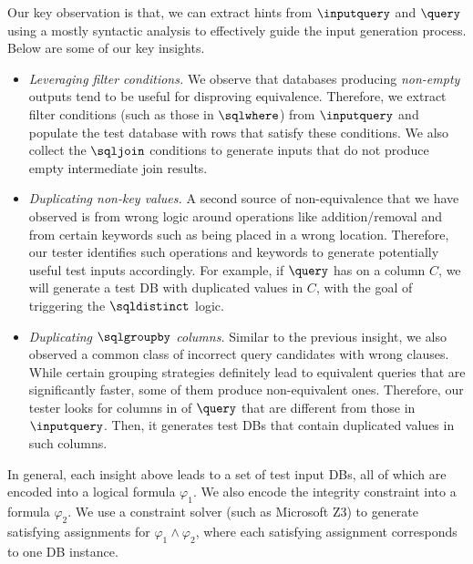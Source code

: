 Our key observation is that, we can extract hints from $\inputquery$ and $\query$ using a mostly syntactic analysis to effectively guide the input generation process. Below are some of our key insights. 
\begin{itemize}[leftmargin=*]
\item 
\emph{Leveraging filter conditions.}
We observe that databases producing \emph{non-empty} outputs tend to be useful for disproving equivalence. 
Therefore, we extract filter conditions (such as those in $\sqlwhere$) from $\inputquery$ and populate the test database with rows that satisfy these conditions. 
We also collect the $\sqljoin$ conditions to generate inputs that do not produce empty intermediate join results. 
\item 
\emph{Duplicating non-key values.}
A second source of non-equivalence that we have observed is from wrong logic around operations like addition/removal and from certain keywords such as \sqldistinct being placed in a wrong location. 
Therefore, our tester identifies such operations and keywords to generate potentially useful test inputs accordingly. For example, if $\query$ has \sqldistinct on a column $C$, we will generate a test DB with duplicated values in $C$, with the goal of triggering the $\sqldistinct$ logic. 
\item 
\emph{Duplicating $\sqlgroupby$ columns.}
Similar to the previous insight, we also observed a common class of incorrect query candidates with wrong \sqlgroupby clauses. 
While certain grouping strategies definitely lead to equivalent queries that are significantly faster, some of them produce non-equivalent ones. 
Therefore, our tester looks for columns in \sqlgroupby of $\query$ that are different from those in $\inputquery$. Then, it generates test DBs that contain duplicated values in such columns. 
\end{itemize}

In general, each insight above leads to a set of test input DBs, all of which are encoded into a logical formula $\varphi_1$. We also encode the integrity constraint into a formula $\varphi_2$. 
We use a constraint solver (such as Microsoft Z3) to generate satisfying assignments for $\varphi_1 \land \varphi_2$, where each satisfying assignment corresponds to one DB instance. 







